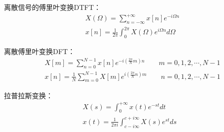 离散信号的傅里叶变换DTFT：
\begin{align*}
&X\left( \varOmega \right) =\sum_{n=-\infty}^{+\infty}{x\left[ n \right] e^{-i\varOmega n}} \\
&x\left[ n \right] =\frac{1}{2\pi}\int_0^{2\pi}{X\left( \varOmega \right) e^{i\varOmega n}d\varOmega}
\end{align*}

离散傅里叶变换DFT：
\begin{align*}
&X\left[ m \right] =\sum_{n=0}^{N-1}{x\left[ n \right] e^{-i\left( \frac{2\pi}{N}m \right) n}} \qquad m=0,1,2,\cdots ,N-1 \\
&x\left[ n \right] =\frac{1}{N}\sum_{m=0}^{N-1}{X\left[ m \right] e^{i\left( \frac{2\pi}{N}n \right) m}} \qquad n=0,1,2,\cdots ,N-1
\end{align*}

拉普拉斯变换：
\begin{align*}
X\left( s \right) =\int_0^{+\infty}{x\left( t \right) e^{-st}dt} \\
x\left( t \right) =\frac{1}{2\pi i}\int_{c-i\infty}^{c+i\infty}{X\left( s \right) e^{st}ds}
\end{align*}





